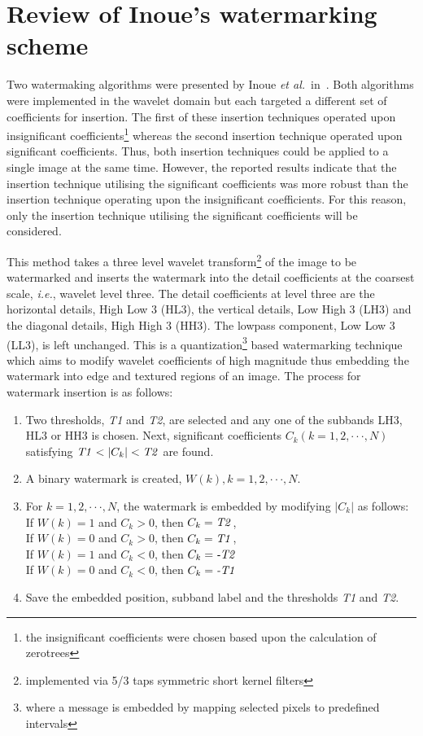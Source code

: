 \documentclass[12pt]{report}
\begin{document}
\section{Review of Inoue's watermarking scheme}
Two watermaking algorithms were presented by Inoue \emph{et al.}~in~\cite{inoueDI}.
Both algorithms were implemented in the wavelet domain but each targeted a different
set of coefficients for insertion. The first of these insertion techniques
operated upon insignificant coefficients\footnote{the insignificant coefficients were chosen based 
upon the calculation of zerotrees}
whereas the second insertion technique operated 
upon significant coefficients. 
Thus, both insertion techniques could be applied to a single
image at the same time. However, the reported results indicate that the insertion technique utilising the
significant coefficients was more robust than the insertion technique operating
upon the insignificant coefficients. For this reason, only the insertion
technique utilising the significant coefficients will be considered. 

This method takes a three level wavelet transform\footnote{implemented via 5/3 taps
symmetric short kernel filters} of the image to be watermarked and
inserts the watermark into the 
detail coefficients at the coarsest scale, \emph{i.e.}, wavelet level three.
The detail coefficients at level three are the horizontal details, High Low 3 (HL3),
the vertical details, Low High 3 (LH3) and the diagonal details, High High 3 (HH3). 
The lowpass component, Low Low 3 (LL3), is left unchanged.
This is a quantization\footnote{where a message is embedded by mapping selected pixels to predefined intervals} based watermarking technique 
which aims to modify 
wavelet coefficients of high magnitude thus embedding the watermark into 
edge and textured regions of an image. The process for watermark insertion is as follows:
\begin{enumerate}
	
	\item Two thresholds, \emph{T1} and \emph{T2}, are selected and any one
	of the subbands LH3, HL3 or HH3 is chosen. Next, 
	significant coefficients $C_{k} (k=1,2,\cdot\cdot\cdot, N)$ satisfying 
	$\mbox{\emph{T1}} < |C_{k}| < \mbox{\emph{T2}}$ are found. 
	
	\item A binary watermark is created, $W(k), k=1,2,\cdot\cdot\cdot, N$. 
	
	\item For $k = 1, 2, \cdot\cdot\cdot, N$, the watermark is embedded by 
	modifying $|C_{k}|$ as follows: \\
	If $W(k) = 1$ and $C_{k} > 0$, then $C_{k} = \mbox{\emph{T2}}$, \\
	If $W(k) = 0$ and $C_{k} > 0$, then $C_{k} = \mbox{\emph{T1}}$, \\
	If $W(k) = 1$ and $C_{k} < 0$, then $C_{k} = \mbox{\emph{-T2}}$ \\
	If $W(k) = 0$ and $C_{k} < 0$, then $C_{k} = \mbox{\emph{-T1}}$

	\item Save the embedded position, subband label and the 
	thresholds \emph{T1} and \emph{T2}.
\end{enumerate}
\end{document}
